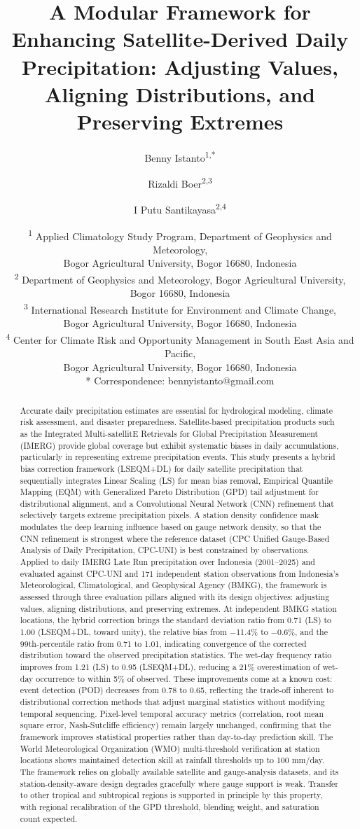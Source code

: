 \documentclass[11pt,a4paper]{article}
\title{\Large A Modular Framework for Enhancing Satellite-Derived Daily Precipitation: Adjusting Values, Aligning Distributions, and Preserving Extremes}
\author{\normalsize
Benny Istanto\textsuperscript{1,*} \and
Rizaldi Boer\textsuperscript{2,3} \and
I Putu Santikayasa\textsuperscript{2,4}
}
\date{\small
\textsuperscript{1} Applied Climatology Study Program, Department of Geophysics and Meteorology,\\
Bogor Agricultural University, Bogor 16680, Indonesia\\[2pt]
\textsuperscript{2} Department of Geophysics and Meteorology, Bogor Agricultural University, Bogor 16680, Indonesia\\[2pt]
\textsuperscript{3} International Research Institute for Environment and Climate Change,\\
Bogor Agricultural University, Bogor 16680, Indonesia\\[2pt]
\textsuperscript{4} Center for Climate Risk and Opportunity Management in South East Asia and Pacific,\\
Bogor Agricultural University, Bogor 16680, Indonesia\\[6pt]
* Correspondence: bennyistanto@gmail.com
}
\begin{document}
\maketitle

\begin{abstract}
Accurate daily precipitation estimates are essential for hydrological modeling, climate risk assessment, and disaster preparedness. Satellite-based precipitation products such as the Integrated Multi-satellitE Retrievals for Global Precipitation Measurement (IMERG) provide global coverage but exhibit systematic biases in daily accumulations, particularly in representing extreme precipitation events. This study presents a hybrid bias correction framework (LSEQM+DL) for daily satellite precipitation that sequentially integrates Linear Scaling (LS) for mean bias removal, Empirical Quantile Mapping (EQM) with Generalized Pareto Distribution (GPD) tail adjustment for distributional alignment, and a Convolutional Neural Network (CNN) refinement that selectively targets extreme precipitation pixels. A station density confidence mask modulates the deep learning influence based on gauge network density, so that the CNN refinement is strongest where the reference dataset (CPC Unified Gauge-Based Analysis of Daily Precipitation, CPC-UNI) is best constrained by observations. Applied to daily IMERG Late Run precipitation over Indonesia (2001--2025) and evaluated against CPC-UNI and 171 independent station observations from Indonesia's Meteorological, Climatological, and Geophysical Agency (BMKG), the framework is assessed through three evaluation pillars aligned with its design objectives: adjusting values, aligning distributions, and preserving extremes. At independent BMKG station locations, the hybrid correction brings the standard deviation ratio from 0.71 (LS) to 1.00 (LSEQM+DL, toward unity), the relative bias from $-$11.4\% to $-$0.6\%, and the 99th-percentile ratio from 0.71 to 1.01, indicating convergence of the corrected distribution toward the observed precipitation statistics. The wet-day frequency ratio improves from 1.21 (LS) to 0.95 (LSEQM+DL), reducing a 21\% overestimation of wet-day occurrence to within 5\% of observed. These improvements come at a known cost: event detection (POD) decreases from 0.78 to 0.65, reflecting the trade-off inherent to distributional correction methods that adjust marginal statistics without modifying temporal sequencing. Pixel-level temporal accuracy metrics (correlation, root mean square error, Nash-Sutcliffe efficiency) remain largely unchanged, confirming that the framework improves statistical properties rather than day-to-day prediction skill. The World Meteorological Organization (WMO) multi-threshold verification at station locations shows maintained detection skill at rainfall thresholds up to 100 mm/day. The framework relies on globally available satellite and gauge-analysis datasets, and its station-density-aware design degrades gracefully where gauge support is weak. Transfer to other tropical and subtropical regions is supported in principle by this property, with regional recalibration of the GPD threshold, blending weight, and saturation count expected.


\end{abstract}
\end{document}
